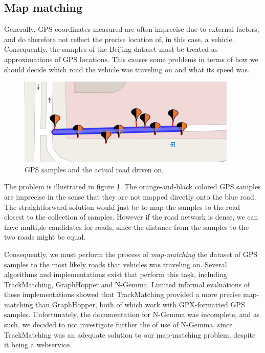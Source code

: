 \subsection{Map matching}\label{sec:mapmatching}
Generally, GPS coordinates measured are often imprecise due to external factors, and do therefore not reflect the precise location of, in this case, a vehicle. Consequently, the samples of the Beijing dataset must be treated as approximations of GPS locations. This causes some problems in terms of how we should decide which road the vehicle was traveling on and what its speed was.

\begin{figure}
\includegraphics[scale=1]{figures/mapmatching.png}
\caption{GPS samples and the actual road driven on.}
\label{fig:mapmatching}
\end{figure}

The problem is illustrated in figure \ref{fig:mapmatching}. The orange-and-black colored GPS samples are imprecise in the sense that they are not mapped directly onto the blue road. The straightforward solution would just be to map the samples to the road closest to the collection of samples. However if the road network is dense, we can have multiple candidates for roads, since the distance from the samples to the two roads might be equal.

Consequently, we must perform the process of \emph{map-matching} the dataset of GPS samples to the most likely roads that vehicles was traveling on. Several algorithms and implementations exist that perform this task, including TrackMatching, GraphHopper and N-Gemma. Limited informal evaluations of these implementations showed that TrackMatching provided a more precise map-matching than GraphHopper, both of which work with GPX-formatted GPS samples. Unfortunately, the documentation for N-Gemma was incomplete, and as such, we decided to not investigate further the of use of N-Gemma, since TrackMatching was an adequate solution to our map-matching problem, despite it being a webservice.

